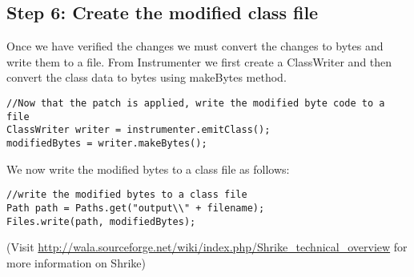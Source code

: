 \documentclass[11pt,psfig,a4]{article}
\begin{document}
\begin{flushleft}
\subsection{Step 6: Create the modified class file}
Once we have verified the changes we must convert the changes to bytes and write them to a file. From Instrumenter we first create a ClassWriter and then convert the class data to bytes using makeBytes method.\\
\begin{lstlisting}
//Now that the patch is applied, write the modified byte code to a file
ClassWriter writer = instrumenter.emitClass();
modifiedBytes = writer.makeBytes();
\end{lstlisting}
We now write the modified bytes to a class file as follows:\\
\begin{lstlisting}
//write the modified bytes to a class file
Path path = Paths.get("output\\" + filename);
Files.write(path, modifiedBytes);
\end{lstlisting}
(Visit \url{http://wala.sourceforge.net/wiki/index.php/Shrike_technical_overview} for more information on Shrike)\\

\end{flushleft}
\end{document}
